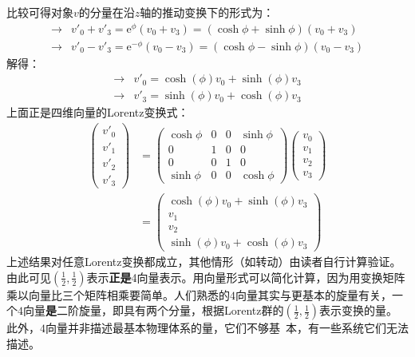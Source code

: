 比较可得对象$v$的分量在沿$z$轴的推动变换下的形式为：
\begin{align*}
    \rightarrow& v'_0 + v'_3 = \mathrm{e}^{\phi} (v_0 + v_3) = ( \cosh \phi + \sinh \phi) (v_0 + v_3) \\
    \rightarrow& v'_0 - v'_3 = \mathrm{e}^{- \phi} (v_0 - v_3) = ( \cosh \phi - \sinh \phi) (v_0 - v_3)
\end{align*}
解得：
\begin{align}
    \rightarrow& v'_0 = \cosh(\phi) v_0 + \sinh(\phi) v_3 \nonumber \\
\label{equ3.220}
    \rightarrow& v'_3 = \sinh(\phi) v_0 + \cosh (\phi) v_3
\end{align}
上面正是四维向量的Lorentz变换式：
\begin{align}
    \begin{pmatrix}
        v'_0 \\ v'_1 \\ v'_2 \\ v'_3
    \end{pmatrix}
    &=
    \begin{pmatrix}
        \cosh \phi & 0 & 0 & \sinh \phi \\
        0 & 1 & 0 & 0 \\
        0 & 0 & 1 & 0 \\
        \sinh \phi & 0 & 0 & \cosh \phi
    \end{pmatrix}
    \begin{pmatrix}
        v_0 \\ v_1 \\ v_2 \\ v_3
    \end{pmatrix}
    \nonumber \\
\label{equ3.221}
    &=
        \begin{pmatrix}
            \cosh(\phi) v_0 + \sinh (\phi) v_3 \\
            v_1 \\
            v_2 \\
            \sinh(\phi) v_0 + \cosh(\phi) v_3
        \end{pmatrix}
\end{align}
上述结果对任意Lorentz变换都成立，其他情形（如转动）由读者自行计算验证。由此可见$(\frac{1}{2}, \frac{1}{2})$表示{\bfseries 正是}4向量表示。用向量形式可以简化计算，因为用变换矩阵乘以向量比三个矩阵相乘要简单。人们熟悉的$4$向量其实与更基本的旋量有关，一个$4$向量{\bfseries 是}二阶旋量，即具有两个分量，根据Lorentz群的$(\frac{1}{2}, \frac{1}{2})$表示变换的量。此外，$4$向量并非描述最基本物理体系的量，它们不够基\ 本，有一些系统它们无法描述。


